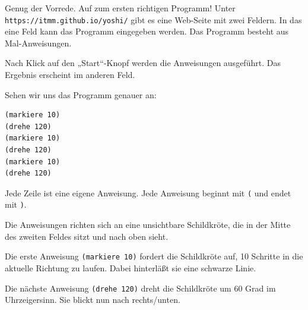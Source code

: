 \documentclass[a5paper,ngerman,9pt]{article}
\begin{document}
\begin{multicols}{2}
	Genug der Vorrede.
	Auf zum ersten richtigen Programm!
	Unter \verb|https://itmm.github.io/yoshi/| gibt es eine Web-Seite
	mit zwei Feldern.
	In das eine Feld kann das Programm eingegeben werden.
	Das Programm besteht aus Mal-Anweisungen.
\end{multicols}

\begin{center}
\end{center}

\begin{multicols}{2}
	Nach Klick auf den „Start“-Knopf werden die Anweisungen ausgeführt.
	Das Ergebnis erscheint im anderen Feld.

	Sehen wir uns das Programm genauer an:

	\begin{Verbatim}
(markiere 10)
(drehe 120)
(markiere 10)
(drehe 120)
(markiere 10)
(drehe 120)
	\end{Verbatim}

	Jede Zeile ist eine eigene Anweisung.
	Jede Anweisung beginnt mit \verb|(| und endet mit
	\verb|)|.

	Die Anweisungen richten sich an eine unsichtbare Schildkröte, die
	in der Mitte des zweiten Feldes sitzt und nach oben sieht.

	Die erste Anweisung \verb|(markiere 10)| fordert die Schildkröte auf,
	10 Schritte in die aktuelle Richtung zu laufen.
	Dabei hinterläßt sie eine schwarze Linie.

	Die nächste Anweisung \verb|(drehe 120)| dreht die Schildkröte um
	$60$ Grad im Uhrzeigersinn. Sie blickt nun nach rechts/unten.
\end{multicols}
\end{document}
